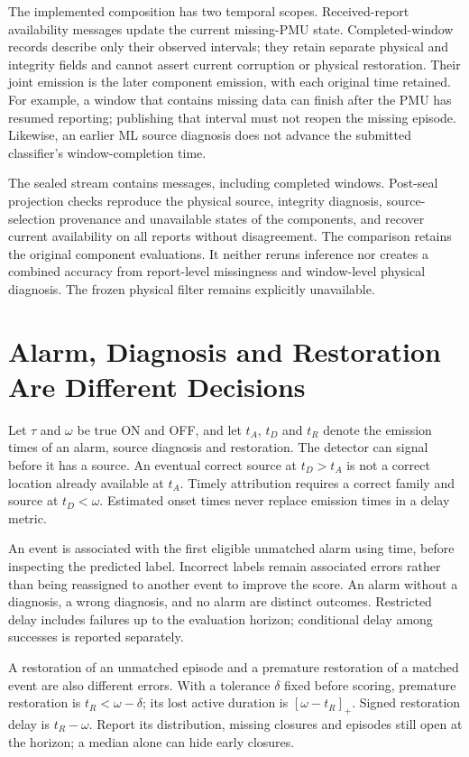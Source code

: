 The implemented composition has two temporal scopes. Received-report
availability messages update the current missing-PMU state. Completed-window
records describe only their observed intervals; they retain separate physical
and integrity fields and cannot assert current corruption or physical
restoration. Their joint emission is the later component emission, with each
original time retained. For example, a window that contains missing data can
finish after the PMU has resumed reporting; publishing that interval must not
reopen the missing episode. Likewise, an earlier ML source diagnosis does not
advance the submitted classifier's window-completion time.

The sealed stream contains \SystemMessages{} messages, including
\SystemWindows{} completed windows. Post-seal projection checks reproduce
the physical source, integrity diagnosis, source-selection provenance and
unavailable states of the components, and recover current availability on
all \SystemReports{} reports without disagreement. The comparison retains
the original component evaluations. It neither reruns inference nor creates
a combined accuracy from report-level missingness and window-level physical
diagnosis. The frozen physical filter remains explicitly unavailable.

\section{Alarm, Diagnosis and Restoration Are Different Decisions}
\label{app:decision-metrics}

Let $\tau$ and $\omega$ be true ON and OFF, and let
$t_A$, $t_D$ and $t_R$ denote the emission times of an alarm, source
diagnosis and restoration. The detector can signal before it has a source.
An eventual correct source at $t_D>t_A$ is not a correct location already
available at $t_A$. Timely attribution requires a correct family and source
at $t_D<\omega$. Estimated onset times never replace emission times in a
delay metric.

An event is associated with the first eligible unmatched alarm using time,
before inspecting the predicted label. Incorrect labels remain associated
errors rather than being reassigned to another event to improve the score.
An alarm without a diagnosis, a wrong diagnosis, and no alarm are distinct
outcomes. Restricted delay includes failures up to the evaluation horizon;
conditional delay among successes is reported separately.

A restoration of an unmatched episode and a premature restoration of a
matched event are also different errors. With a tolerance $\delta$ fixed
before scoring, premature restoration is $t_R<\omega-\delta$; its lost
active duration is $[\omega-t_R]_+$. Signed restoration delay is
$t_R-\omega$. Report its distribution, missing closures and episodes still
open at the horizon; a median alone can hide early closures.

